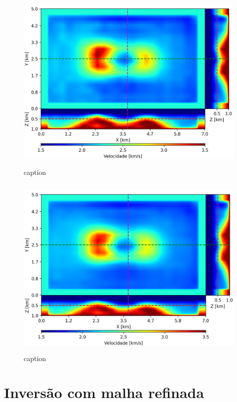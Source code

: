 \begin{figure}[H]
	\centering
	\includegraphics[width=12cm,height=9cm]{Imgs/Resultados/fim_sparse.png}
	\caption{caption}
	\label{fig:}	
\end{figure}


\begin{figure}[H]
	\centering
	\includegraphics[width=12cm,height=9cm]{Imgs/Resultados/fsm_sparse.png}
	\caption{caption}
	\label{fig:}	
\end{figure}


\section{Inversão com malha refinada}


